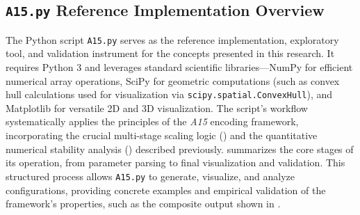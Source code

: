 \documentclass[10pt]{article}
\def\AAAB{\textit{A15}}
\begin{document}
\subsection{\texttt{A15.py} Reference Implementation Overview}\label{subsec-implementation-a15py}

The Python script \texttt{A15.py} \cite{Risinger2024A15} serves as the reference implementation, exploratory tool, and validation instrument for the concepts presented in this research. It requires Python 3 and leverages standard scientific libraries—NumPy \cite{Harris2020} for efficient numerical array operations, SciPy \cite{Virtanen2020} for geometric computations (such as convex hull calculations used for visualization via \texttt{scipy.spatial.ConvexHull}), and Matplotlib \cite{Hunter2007} for versatile 2D and 3D visualization. The script's workflow systematically applies the principles of the \AAAB{} encoding framework, incorporating the crucial multi-stage scaling logic () and the quantitative numerical stability analysis () described previously.  summarizes the core stages of its operation, from parameter parsing to final visualization and validation. This structured process allows \texttt{A15.py} to generate, visualize, and analyze configurations, providing concrete examples and empirical validation of the framework's properties, such as the composite output shown in .
\end{document}
